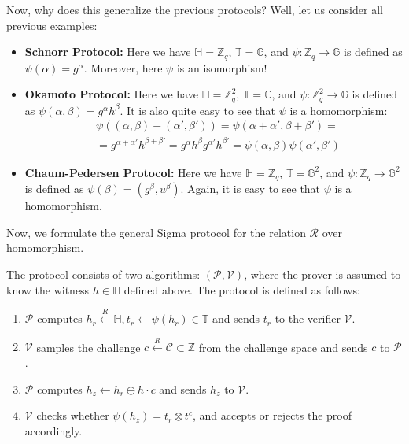 \documentclass[../lecture-notes.tex]{subfiles}
\begin{document}
\begin{proposition}
    Now, why does this generalize the previous protocols? Well, let us consider all previous examples:
    \begin{itemize}
        \item \textbf{Schnorr Protocol:} Here we have $\mathbb{H} = \mathbb{Z}_q$, $\mathbb{T} = \mathbb{G}$, and $\psi: \mathbb{Z}_q \to \mathbb{G}$ is defined as $\psi(\alpha) = g^{\alpha}$. Moreover, here $\psi$ is an isomorphism!
        \item \textbf{Okamoto Protocol:} Here we have $\mathbb{H} = \mathbb{Z}_q^2$, $\mathbb{T} = \mathbb{G}$, and $\psi: \mathbb{Z}_q^2 \to \mathbb{G}$ is defined as $\psi(\alpha,\beta) = g^{\alpha}h^{\beta}$. It is also quite easy to see that $\psi$ is a homomorphism:
        \begin{equation*}
            \begin{aligned}
                &\psi((\alpha,\beta) + (\alpha',\beta')) = \psi(\alpha+\alpha',\beta+\beta') = \\ 
                &= g^{\alpha+\alpha'}h^{\beta+\beta'} = g^{\alpha}h^{\beta}g^{\alpha'}h^{\beta'} = \psi(\alpha,\beta)\psi(\alpha',\beta')                
            \end{aligned}
        \end{equation*}
        \item \textbf{Chaum-Pedersen Protocol:} Here we have $\mathbb{H} = \mathbb{Z}_q$, $\mathbb{T} = \mathbb{G}^2$, and $\psi: \mathbb{Z}_q \to \mathbb{G}^2$ is defined as $\psi(\beta) = (g^{\beta},u^{\beta})$. Again, it is easy to see that $\psi$ is a homomorphism.
    \end{itemize}
\end{proposition}

\vspace{-1mm}

Now, we formulate the general Sigma protocol for the relation $\mathcal{R}$ over homomorphism.

\vspace{-1mm}

\begin{definition}
    The protocol consists of two algorithms: $(\mathcal{P}, \mathcal{V})$, where the prover is assumed to know the witness $h \in \mathbb{H}$ defined above. The protocol is defined as follows:
    \begin{enumerate}
        \item $\mathcal{P}$ computes $h_r \xleftarrow{R} \mathbb{H}, t_r \gets \psi(h_r) \in \mathbb{T}$ and sends $t_r$ to the verifier $\mathcal{V}$.
        \item $\mathcal{V}$ samples the challenge $c \xleftarrow{R} \mathcal{C} \subset \mathbb{Z}$ from the challenge space and sends $c$ to $\mathcal{P}$.
        \item $\mathcal{P}$ computes $h_z \gets h_r \oplus h\cdot c$ and sends $h_z$ to $\mathcal{V}$.
        \item $\mathcal{V}$ checks whether $\psi(h_z) = t_r \otimes t^c$, and accepts or rejects the proof accordingly.
    \end{enumerate}
\end{definition}
\end{document}
